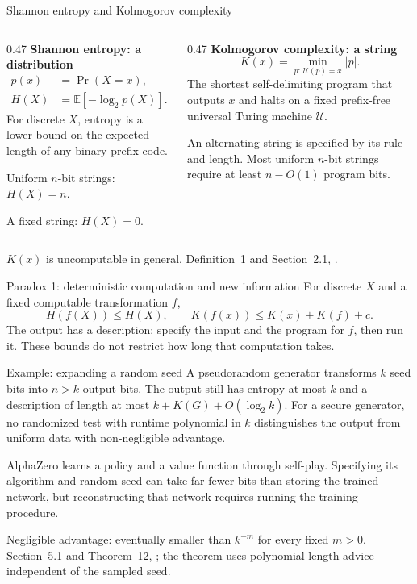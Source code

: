 \documentclass[aspectratio=169,notheorems]{beamer}
\theoremstyle{definition}
\newcommand{\E}{\mathbb{E}}
\newcommand{\src}[1]{{\scriptsize\color{black!60}#1\par}}
\begin{document}
\begin{frame}{Shannon entropy and Kolmogorov complexity}
\small
\begin{columns}[T]
\begin{column}{0.47\textwidth}
\textbf{Shannon entropy: a distribution}
\[
\begin{aligned}
p(x)&=\Pr(X=x),\\[-0.15em]
H(X)&=\E[-\log_2 p(X)].
\end{aligned}
\]
For discrete $X$, entropy is a lower bound on the expected length of any binary prefix code.

\medskip
Uniform $n$-bit strings: $H(X)=n$.

\smallskip
A fixed string: $H(X)=0$.
\end{column}
\begin{column}{0.47\textwidth}
\textbf{Kolmogorov complexity: a string}
\[
K(x)=\min_{p:\,\mathcal U(p)=x}|p|.
\]
The shortest self-delimiting program that outputs $x$ and halts on a fixed prefix-free universal Turing machine $\mathcal U$.

\medskip
An alternating string is specified by its rule and length. Most uniform $n$-bit strings require at least $n-O(1)$ program bits.
\end{column}
\end{columns}
\medskip
\src{$K(x)$ is uncomputable in general. Definition~1 and Section~2.1, \citet{finzi2026}.}
\end{frame}
\begin{frame}{Paradox 1: deterministic computation and new information}
\small
For discrete $X$ and a fixed computable transformation $f$,
\[
H(f(X))\le H(X),\qquad K(f(x))\le K(x)+K(f)+c.
\]
The output has a description: specify the input and the program for $f$, then run it. These bounds do not restrict how long that computation takes.

\begin{block}{Example: expanding a random seed}
A pseudorandom generator transforms $k$ seed bits into $n>k$ output bits. The output still has entropy at most $k$ and a description of length at most $k+K(G)+O(\log_2 k)$. For a secure generator, no randomized test with runtime polynomial in $k$ distinguishes the output from uniform data with non-negligible advantage.
\end{block}
AlphaZero learns a policy and a value function through self-play. Specifying its algorithm and random seed can take far fewer bits than storing the trained network, but reconstructing that network requires running the training procedure.

\medskip
\src{Negligible advantage: eventually smaller than $k^{-m}$ for every fixed $m>0$. Section~5.1 and Theorem~12, \citet{finzi2026}; the theorem uses polynomial-length advice independent of the sampled seed.}
\end{frame}
\end{document}
